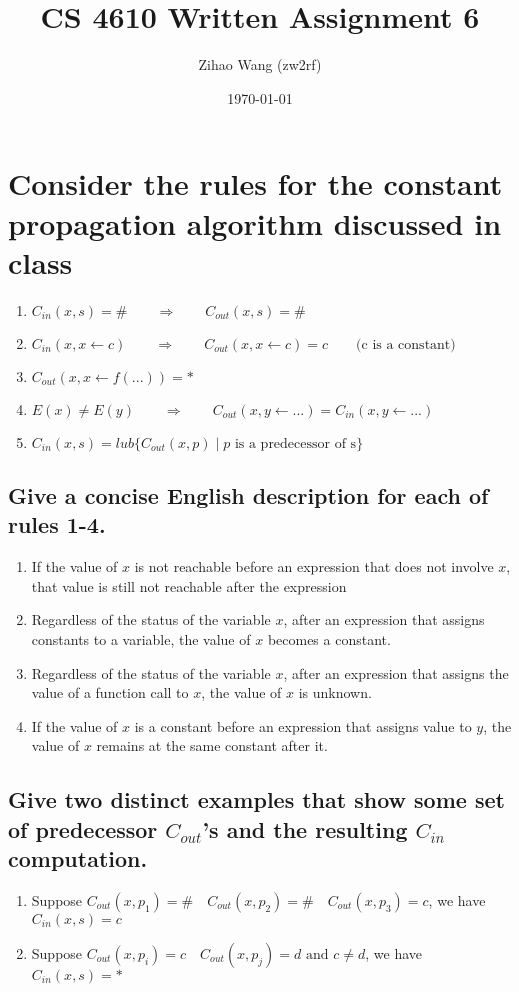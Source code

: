 \documentclass[11pt]{article}
\begin{document}
\thispagestyle{empty}
\title{CS 4610 Written Assignment 6}
\author{Zihao Wang (zw2rf)}
\date{\today}
\maketitle
\doublespacing

\section{Consider the rules for the constant propagation algorithm discussed in class}
\begin{enumerate}
\item $C_{in}(x,s) = \# \qquad \Rightarrow \qquad C_{out}(x, s) = \#$
\item $C_{in}(x, x \leftarrow c) \qquad \Rightarrow \qquad C_{out}(x, x \leftarrow c) = c \qquad \text{(c is a constant)}$
\item $C_{out}(x, x \leftarrow f(...)) = *$
\item $E(x) \neq E(y) \qquad \Rightarrow \qquad C_{out}(x, y \leftarrow ...) = C_{in}(x, y \leftarrow ...)$
\item $C_{in}(x,s) = lub\{ C_{out}(x, p ) \mid p \text{ is a predecessor of s} \}$
\end{enumerate}

\subsection{Give a concise English description for each of rules 1-4.}
\begin{enumerate}
\item If the value of $x$ is not reachable before an expression that does not involve $x$, that value is still not reachable after the expression
\item Regardless of the status of the variable $x$, after an expression that assigns constants to a variable, the value of $x$ becomes a constant.
\item Regardless of the status of the variable $x$, after an expression that assigns the value of a function call to $x$, the value of $x$ is unknown. 
\item If the value of $x$ is a constant before an expression that assigns value to $y$, the value of $x$ remains at the same constant after it.
\end{enumerate}

\subsection{Give two distinct examples that show some set of predecessor $C_{out}$'s and the resulting $C_{in}$ computation.}
\begin{enumerate}
\item Suppose $C_{out}(x, p_{1}) = \# \quad C_{out}(x,p_{2}) = \# \quad C_{out}(x, p_{3}) = c$, we have $C_{in}(x, s) = c$
\item Suppose $C_{out}(x, p_{i}) = c \quad C_{out}(x, p_{j}) = d \text{ and } c \neq d$, we have $C_{in}(x, s) = *$
\end{enumerate}
\end{document}
